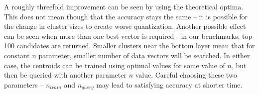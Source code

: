 A roughly threefold improvement can be seen by using the theoretical optima.
This does not mean though that the accuracy stays the same -- it is possible
for the change in cluster sizes to create worse quantization. Another
possible effect can be seen when more than one best vector is required -
in our benchmarks, top-100 candidates are returned. Smaller clusters near
the bottom layer mean that for constant $n$ parameter, smaller number of
data vectors will be searched.
In either case, the centroids can
be trained using optimal values for some value of $n$, but then be queried
with another parameter $n$ value. Careful choosing these two parameters --
$n_{train}$ and $n_{query}$ may lead to satisfying accuracy at shorter time.
